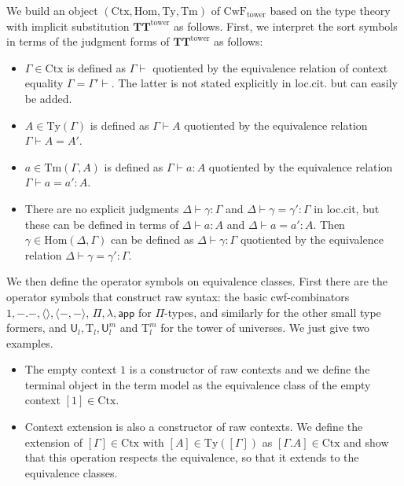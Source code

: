 \documentclass[submission,copyright,creativecommons]{eptcs}
\newcommand{\app}[2]{{#1\,#2}} %
\newcommand{\Ctx}{\mathrm{Ctx}}
\newcommand{\Sub}{\mathrm{Hom}}
\newcommand{\Ty}{\mathrm{Ty}}
\newcommand{\Tm}{\mathrm{Tm}}
\newcommand{\tuple}[1]{\langle #1 \rangle}
\def\app{\mathsf{app}}
\def\U{\mathsf{U}}
\newcommand{\Ta}{\mathrm{T}}
\def\CwFext{\mathrm{CwF_{tower}}}
\def\TText{{\mathbf{TT}^\mathrm{tower}}}
\begin{document}
We build an object $(\Ctx,\Sub,\Ty,\Tm)$ of $\CwFext$ based on the type theory with implicit substitution $\TText$ as follows. First, we interpret the sort symbols in terms of the judgment forms of $\TText$ as follows:
\begin{itemize}
\item $\Gamma \in \Ctx$ is defined as $\Gamma \vdash$ quotiented by the equivalence relation of context equality $\Gamma = \Gamma' \vdash$. The latter is not stated explicitly in loc.cit. but can easily be added.
\item $A \in \Ty(\Gamma)$ is defined as $\Gamma \vdash A$ quotiented by the equivalence relation $\Gamma \vdash A = A'$.
\item $a \in \Tm(\Gamma,A)$ is defined as $\Gamma \vdash a : A$ quotiented by the equivalence relation $\Gamma \vdash a = a' : A$.
\item There are no explicit judgments $\Delta \vdash \gamma : \Gamma$ and $\Delta \vdash \gamma = \gamma' : \Gamma$  in loc.cit, but these can be defined in terms of $\Delta \vdash a : A$ and $\Delta \vdash a = a' : A$. Then $\gamma \in \Sub(\Delta,\Gamma)$ can be defined as $\Delta \vdash \gamma : \Gamma$ quotiented by the equivalence relation $\Delta \vdash  \gamma = \gamma' : \Gamma$.
\end{itemize}
We then define the operator symbols on equivalence classes. First there are the operator symbols that construct raw syntax: the basic cwf-combinators $1, -.-, \tuple{}, \tuple{-,-}$,  $\Pi, \lambda, \app$ for $\Pi$-types, and similarly for the other small type formers, and $\U_l, \Ta_l, \U^m_l$ and $\Ta^m_l$ for the tower of universes. We just give two examples.
\begin{itemize}
\item The empty context $1$ is a constructor of raw contexts and we define the terminal object in the term model as the equivalence class of the empty context $[1] \in \Ctx$.
\item Context extension is also a constructor of raw contexts. We define the extension of $[\Gamma] \in \Ctx$ with $[A] \in \Ty([\Gamma])$ as $[\Gamma.A] \in \Ctx$ and show that this operation respects the equivalence,
so that it extends to the equivalence classes.
\end{itemize}
\end{document}

